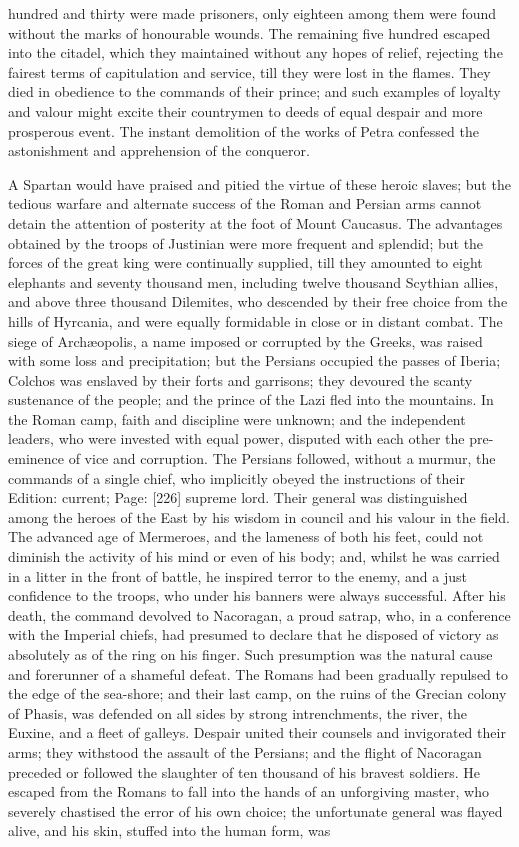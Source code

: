 hundred and thirty were made prisoners, only eighteen among them were found without the marks of honourable wounds. The remaining five hundred escaped into the citadel, which they maintained without any hopes of relief, rejecting the fairest terms of capitulation and service, till they were lost in the flames. They died in obedience to the commands of their prince; and such examples of loyalty and valour might excite their countrymen to deeds of equal despair and more prosperous event. The instant demolition of the works of Petra confessed the astonishment and apprehension of the conqueror.

A Spartan would have praised and pitied the virtue of these heroic slaves; but the tedious warfare and alternate success of the Roman and Persian arms cannot detain the attention of posterity at the foot of Mount Caucasus. The advantages obtained by the troops of Justinian were more frequent and splendid; but the forces of the great king were continually supplied, till they amounted to eight elephants and seventy thousand men, including twelve thousand Scythian allies, and above three thousand Dilemites, who descended by their free choice from the hills of Hyrcania, and were equally formidable in close or in distant combat. The siege of Archæopolis, a name imposed or corrupted by the Greeks, was raised with some loss and precipitation; but the Persians occupied the passes of Iberia; Colchos was enslaved by their forts and garrisons; they devoured the scanty sustenance of the people; and the prince of the Lazi fled into the mountains. In the Roman camp, faith and discipline were unknown; and the independent leaders, who were invested with equal power, disputed with each other the pre-eminence of vice and corruption. The Persians followed, without a murmur, the commands of a single chief, who implicitly obeyed the instructions of their Edition: current; Page: [226] supreme lord. Their general was distinguished among the heroes of the East by his wisdom in council and his valour in the field. The advanced age of Mermeroes, and the lameness of both his feet, could not diminish the activity of his mind or even of his body; and, whilst he was carried in a litter in the front of battle, he inspired terror to the enemy, and a just confidence to the troops, who under his banners were always successful. After his death, the command devolved to Nacoragan, a proud satrap, who, in a conference with the Imperial chiefs, had presumed to declare that he disposed of victory as absolutely as of the ring on his finger. Such presumption was the natural cause and forerunner of a shameful defeat. The Romans had been gradually repulsed to the edge of the sea-shore; and their last camp, on the ruins of the Grecian colony of Phasis, was defended on all sides by strong intrenchments, the river, the Euxine, and a fleet of galleys. Despair united their counsels and invigorated their arms; they withstood the assault of the Persians; and the flight of Nacoragan preceded or followed the slaughter of ten thousand of his bravest soldiers. He escaped from the Romans to fall into the hands of an unforgiving master, who severely chastised the error of his own choice; the unfortunate general was flayed alive, and his skin, stuffed into the human form, was 